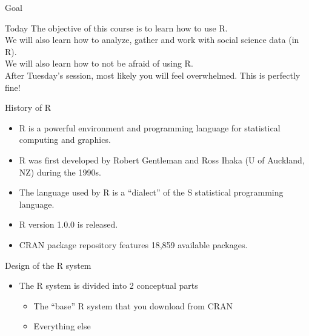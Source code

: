 \documentclass{beamer}
\begin{document}
\begin{frame}{Goal}
\begin{block}{Today} 
The objective of this course is to learn how to use R. \\
We will also learn how to \alert{analyze}, \alert{gather} and \alert{work} with social science data (in R).\\
We will also learn how to not be afraid of using R. \\
After Tuesday's session, most likely you will feel overwhelmed. This is perfectly fine!
\end{block}
\end{frame}

\begin{frame}{History of R}
\begin{itemize}[<+->]
\item R is a powerful environment and programming language for statistical computing and graphics.
\item R was first developed by Robert Gentleman and Ross Ihaka (U of Auckland, NZ) during the 1990s.
\item The language used by R is a ``dialect'' of the S statistical programming language.
\item R version 1.0.0 is released.
\item CRAN package repository features 18,859 available packages.
 \end{itemize} 
\end{frame}


\begin{frame}{Design of the R system}
\begin{itemize}[<+->]
\item The R system is divided into 2 conceptual parts
\begin{itemize}
  \item The ``base'' R system that you download from CRAN
  \item Everything else
  \end{itemize}
 \end{itemize} 
\end{frame}
\end{document}

